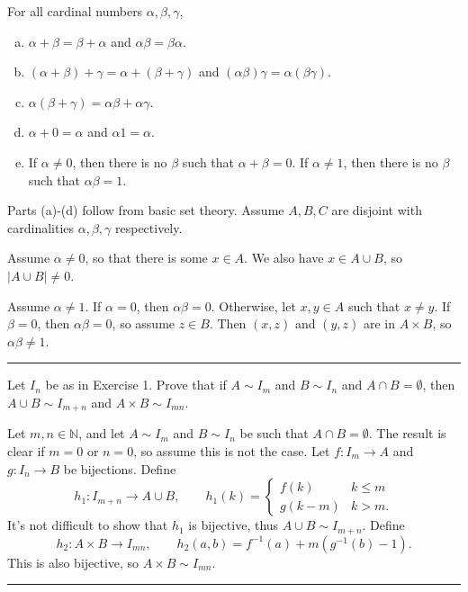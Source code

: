 \begin{exercise}
    For all cardinal numbers $\alpha,\beta,\gamma$,
    \begin{enumerate}[(a)]
        \item $\alpha + \beta = \beta + \alpha$ and $\alpha\beta = \beta\alpha$.
        \item $(\alpha + \beta) + \gamma = \alpha + (\beta + \gamma)$ and $(\alpha\beta)\gamma = \alpha(\beta\gamma)$.
        \item $\alpha(\beta + \gamma) = \alpha\beta + \alpha\gamma$.
        \item $\alpha + 0 = \alpha$ and $\alpha 1 = \alpha$.
        \item If $\alpha\ne 0$, then there is no $\beta$ such that $\alpha + \beta = 0$. If $\alpha\ne 1$, then there is no $\beta$ such that $\alpha\beta = 1$.
    \end{enumerate}
\end{exercise}
\begin{solution}
    Parts (a)-(d) follow from basic set theory. Assume $A,B,C$ are disjoint with cardinalities $\alpha,\beta,\gamma$ respectively.

    Assume $\alpha\ne 0$, so that there is some $x\in A$. We also have $x\in A\cup B$, so $|A\cup B|\ne 0$.

    Assume $\alpha\ne 1$. If $\alpha=0$, then $\alpha\beta = 0$. Otherwise, let $x,y\in A$ such that $x\ne y$. If $\beta = 0$, then $\alpha\beta = 0$, so assume $z\in B$. Then $(x,z)$ and $(y,z)$ are in $A\times B$, so $\alpha\beta\ne 1$.
\end{solution}
\hrule

\begin{exercise}
    Let $I_n$ be as in Exercise 1. Prove that if $A\sim I_m$ and $B\sim I_n$ and $A\cap B = \emptyset$, then $A\cup B\sim I_{m+n}$ and $A\times B\sim I_{mn}$.
\end{exercise}
\begin{solution}
    Let $m,n\in\mathbb{N}$, and let $A\sim I_m$ and $B\sim I_n$ be such that $A\cap B=\emptyset$. The result is clear if $m=0$ or $n=0$, so assume this is not the case. Let $f:I_m\to A$ and $g:I_n\to B$ be bijections. Define
    $$h_1:I_{m+n}\to A\cup B,\qquad h_1(k) = \begin{cases}
        f(k) & k \le m \\
        g(k-m) & k > m.
    \end{cases}$$
    It's not difficult to show that $h_1$ is bijective, thus $A\cup B\sim I_{m+n}$. Define
    $$h_2:A\times B\to I_{mn},\qquad h_2(a,b) = f^{-1}(a) + m(g^{-1}(b)-1).$$
    This is also bijective, so $A\times B\sim I_{mn}$.
\end{solution}
\hrule

